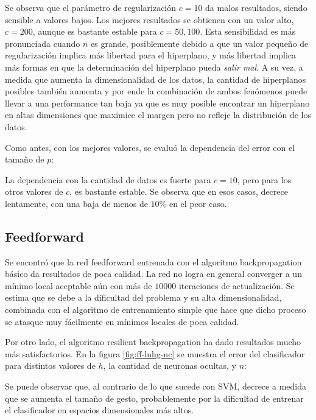 Se observa que el parámetro de regularización $c=10$ da malos resultados, siendo sensible a valores bajos. Los mejores resultados se obtienen con un valor alto, $c=200$, aunque es bastante estable para $c=50,100$. Esta sensibilidad es más pronunciada cuando $n$ es grande, posiblemente debido a que un valor pequeño de regularización implica más libertad para el hiperplano, y más libertad implica más formas en que la determinación del hiperplano pueda \textit{salir mal}. A su vez, a medida que aumenta la dimensionalidad de los datos, la cantidad de hiperplanos posibles también aumenta y por ende la combinación de ambos fenómenos puede llevar a una performance tan baja ya que es muy posible encontrar un hiperplano en altas dimensiones que maximice el margen pero no refleje la distribución de los datos.

Como antes, con los mejores valores, se evaluó la dependencia del error con el tamaño de $p$:


La dependencia con la cantidad de datos es fuerte para $c=10$, pero para los otros valores de $c$, \cc es bastante estable. Se observa que en esos casos, \cc decrece lentamente, con una baja de menos de $10\%$ en el peor caso.

\subsection{Feedforward}

Se encontró que la red feedforward entrenada con el algoritmo backpropagation básico da resultados de poca calidad. La red no logra en general converger a un mínimo local aceptable aún con más de $10000$ iteraciones de actualización. Se estima que se debe a la dificultad del problema y su alta dimensionalidad, combinada con el algoritmo de entrenamiento simple que hace que dicho proceso se atasque muy fácilmente en mínimos locales de poca calidad.

Por otro lado, el algoritmo resilient backpropagation ha dado resultados mucho más satisfactorios. En la figura \ref{fig:ff-lnhg-nc} se muestra el error del clasificador para distintos valores de $h$, la cantidad de neuronas ocultas, y $n$:


Se puede observar que, al contrario de lo que sucede con SVM, \cc decrece a medida que se aumenta el tamaño de gesto, probablemente por la dificultad de entrenar el clasificador en espacios dimensionales más altos.

